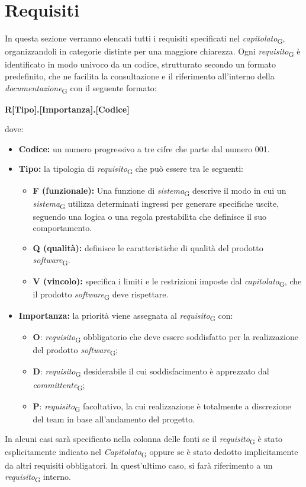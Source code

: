 \section{Requisiti}
In questa sezione verranno elencati tutti i requisiti specificati nel \textit{capitolato}\textsubscript{G}, organizzandoli in categorie distinte per una maggiore chiarezza. Ogni \textit{requisito}\textsubscript{G} è identificato in modo univoco da un codice, strutturato secondo un formato predefinito, che ne facilita la consultazione e il riferimento all'interno della \textit{documentazione}\textsubscript{G} con il seguente formato: 
\begin{center}
\textbf{R[Tipo].[Importanza].[Codice]}
\end{center}
dove:
\begin{itemize}
    \item \textbf{Codice:} un numero progressivo a tre cifre che parte dal numero 001.
    \item \textbf{Tipo:} la tipologia di \textit{requisito}\textsubscript{G} che può essere tra le seguenti:
    \begin{itemize}[label=-]
        \item \textbf{F (funzionale):} Una funzione di \textit{sistema}\textsubscript{G} descrive il modo in cui un \textit{sistema}\textsubscript{G} utilizza determinati ingressi per generare specifiche uscite, seguendo una logica o una regola prestabilita che definisce il suo comportamento.
        \item \textbf{Q (qualità):} definisce le caratteristiche di qualità del prodotto \textit{software}\textsubscript{G}.
        \item \textbf{V (vincolo):} specifica i limiti e le restrizioni imposte dal \textit{capitolato}\textsubscript{G}, che il prodotto \textit{software}\textsubscript{G} deve rispettare.
\end{itemize}
    \item \textbf{Importanza:} la priorità viene assegnata al \textit{requisito}\textsubscript{G} con:
    \begin{itemize}
     \item \textbf{O}: \textit{requisito}\textsubscript{G} obbligatorio che deve essere soddisfatto per la realizzazione del prodotto \textit{software}\textsubscript{G};
        \item \textbf{D}: \textit{requisito}\textsubscript{G} desiderabile il cui soddisfacimento è apprezzato dal \textit{committente}\textsubscript{G};
        \item \textbf{P}: \textit{requisito}\textsubscript{G} facoltativo, la cui realizzazione è totalmente a discrezione del team in base all'andamento del progetto.
    \end{itemize}
\end{itemize}
In alcuni casi sarà specificato nella colonna delle fonti se il \textit{requisito}\textsubscript{G} è stato esplicitamente indicato nel \textit{Capitolato}\textsubscript{G} oppure se è stato dedotto implicitamente da altri requisiti obbligatori. In quest’ultimo caso, si farà riferimento a un \textit{requisito}\textsubscript{G} interno.
